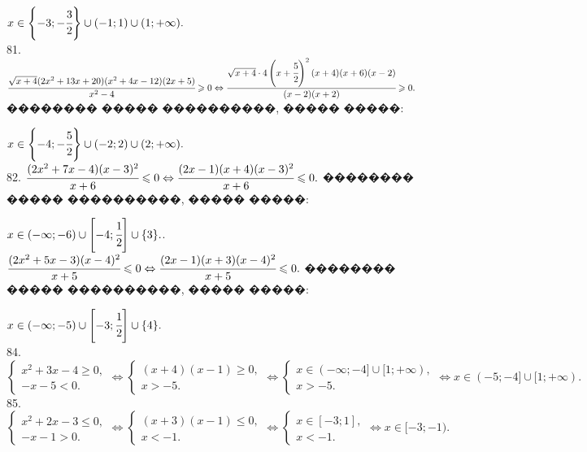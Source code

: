\documentclass[12pt]{article}
\begin{document}
\begin{figure}[ht!]
\end{figure}
$x\in\left\{-3;-\cfrac{3}{2}\right\}\cup(-1;1)\cup(1;+\infty).$\\
81. $\cfrac{\sqrt{x+4}(2x^2+13x+20)(x^2+4x-12)(2x+5)}{x^2-4}\geqslant0\Leftrightarrow \cfrac{\sqrt{x+4}\cdot4\left(x+\cfrac{5}{2}\right)^2(x+4)(x+6)(x-2)}{(x-2)(x+2)}\geqslant0.$ �������� ����� ����������, ����� �����:
\begin{figure}[ht!]
\end{figure}
$x\in\left\{-4;-\cfrac{5}{2}\right\}\cup(-2;2)\cup(2;+\infty).$\\
82. $\cfrac{(2x^2+7x-4)(x-3)^2}{x+6}\leqslant0\Leftrightarrow\cfrac{(2x-1)(x+4)(x-3)^2}{x+6}\leqslant0.$
�������� ����� ����������, ����� �����:
\begin{figure}[ht!]
\end{figure}
$x\in(-\infty;-6)\cup\left[-4;\cfrac{1}{2}\right]\cup\{3\}.$\newpage{}. $\cfrac{(2x^2+5x-3)(x-4)^2}{x+5}\leqslant0\Leftrightarrow\cfrac{(2x-1)(x+3)(x-4)^2}{x+5}\leqslant0.$
�������� ����� ����������, ����� �����:
\begin{figure}[ht!]
\end{figure}
$x\in(-\infty;-5)\cup\left[-3;\cfrac{1}{2}\right]\cup\{4\}.$\\
84. $\begin{cases} x^2+3x-4\geqslant0,\\ -x-5<0.\end{cases}\Leftrightarrow \begin{cases} (x+4)(x-1)\geqslant0,\\ x>-5.\end{cases}
\Leftrightarrow \begin{cases} x\in(-\infty;-4]\cup[1;+\infty),\\ x>-5.\end{cases}\Leftrightarrow x\in(-5;-4]\cup[1;+\infty).$\\
85. $\begin{cases} x^2+2x-3\leqslant0,\\ -x-1>0.\end{cases} \Leftrightarrow\begin{cases} (x+3)(x-1)\leqslant0,\\ x<-1.\end{cases}
\Leftrightarrow\begin{cases} x\in[-3;1],\\ x<-1.\end{cases}\Leftrightarrow x\in[-3;-1).$\\
\end{document}
